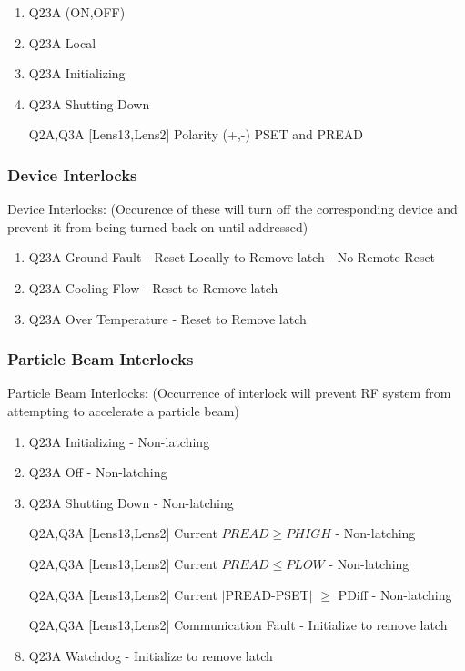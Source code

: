 \documentclass[11pt]{book}		%
\begin{document}
\begin{enumerate}
 \item Q23A (ON,OFF)
 \item Q23A Local
 \item Q23A Initializing
 \item Q23A Shutting Down
 \item [Q2A,Q3A] [Lens13,Lens2] Polarity (+,-) PSET and PREAD
\end{enumerate}

\subsubsection{Device Interlocks}\label{sect:cyc-op-interface-status-beamline-tofc1-state-monitors-device-interlocks}

Device Interlocks:
(Occurence of these will turn off the corresponding device and prevent it from being turned back on until addressed)

\begin{enumerate}
 \item Q23A Ground Fault - Reset Locally to Remove latch - No Remote Reset
 \item Q23A Cooling Flow - Reset to Remove latch
 \item Q23A Over Temperature - Reset to Remove latch
\end{enumerate}

\subsubsection{Particle Beam Interlocks}\label{sect:cyc-op-interface-status-beamline-tofc1-state-monitors-beam-interlocks}

Particle Beam Interlocks:
(Occurrence of interlock will prevent RF system from attempting to accelerate a particle beam)

\begin{enumerate}
 \item Q23A Initializing - Non-latching
 \item Q23A Off - Non-latching
 \item Q23A Shutting Down - Non-latching
 \item [Q2A,Q3A] [Lens13,Lens2] Current $PREAD \geq PHIGH$ - Non-latching
 \item [Q2A,Q3A] [Lens13,Lens2] Current $PREAD \leq PLOW$ - Non-latching
 \item [Q2A,Q3A] [Lens13,Lens2] Current $\mid$PREAD-PSET$\mid$  $\geq$ PDiff - Non-latching
 \item [Q2A,Q3A] [Lens13,Lens2] Communication Fault - Initialize to remove latch
 \item Q23A Watchdog - Initialize to remove latch
\end{enumerate}
\end{document}
